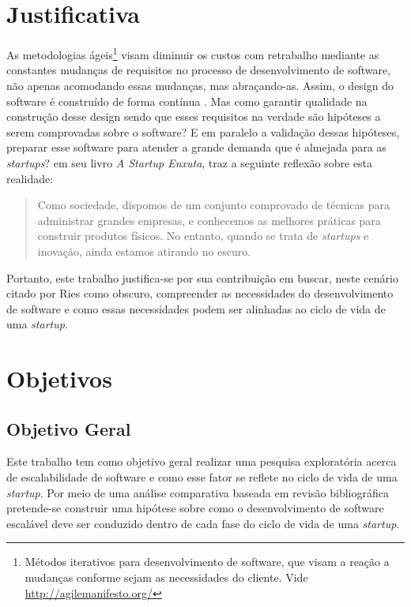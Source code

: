 \section{Justificativa}

As metodologias ágeis\footnote{Métodos iterativos para desenvolvimento de software,
que visam a reação a mudanças conforme sejam as necessidades do cliente. Vide
\url{http://agilemanifesto.org/}} visam diminuir os custos com retrabalho mediante as
constantes mudanças de requisitos no processo de desenvolvimento de software,
não apenas acomodando essas mudanças, mas abraçando-as. Assim, o design do
software é construído de forma contínua \cite{AgileSoftwareInnovation}.
Mas como garantir qualidade na construção desse design sendo que esses requisitos
na verdade são hipóteses a serem comprovadas sobre o software? E em paralelo
a validação dessas hipóteses, preparar esse software para atender a grande
demanda que é almejada para as \textit{startups}? 
em seu livro \textit{A Startup Enxuta}, traz a seguinte reflexão sobre esta
realidade:

  \begin{quotation}{}{}
    Como sociedade, dispomos de um conjunto comprovado de técnicas para
    administrar grandes empresas, e conhecemos as melhores práticas para
    construir produtos físicos. No entanto, quando se trata de \textit{startups}
    e inovação, ainda estamos atirando no escuro.
  \end{quotation}

Portanto, este trabalho justifica-se por sua contribuição em buscar, neste
cenário citado por Ries como obscuro, compreender as necessidades do desenvolvimento
de software e como essas necessidades podem ser alinhadas ao ciclo de vida de uma \textit{startup}.

\section{Objetivos}

\subsection{Objetivo Geral}
\label{sec:ObjetivoGeral}

Este trabalho tem como objetivo geral realizar uma pesquisa exploratória acerca de escalabilidade de
software e como esse fator se reflete no ciclo de vida de uma \textit{startup}. Por meio de uma
análise comparativa baseada em revisão bibliográfica pretende-se construir uma hipótese
sobre como o desenvolvimento de software escalável deve ser conduzido dentro de cada fase do ciclo
de vida de uma \textit{startup}.


